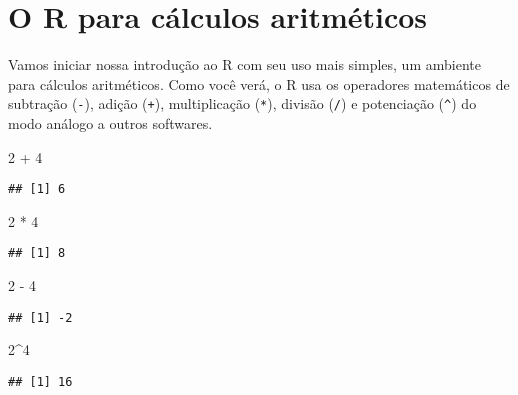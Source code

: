 \documentclass[
]{book}
\newenvironment{Shaded}{\begin{snugshade}}{\end{snugshade}}
\newcommand{\DecValTok}[1]{\textcolor[rgb]{0.00,0.00,0.81}{#1}}
\newcommand{\SpecialCharTok}[1]{\textcolor[rgb]{0.00,0.00,0.00}{#1}}
\begin{document}
\hypertarget{o-r-para-cuxe1lculos-aritmuxe9ticos}{%
\section{O R para cálculos aritméticos}\label{o-r-para-cuxe1lculos-aritmuxe9ticos}}

Vamos iniciar nossa introdução ao R com seu uso mais simples, um ambiente para cálculos aritméticos. Como você verá, o R usa os operadores matemáticos de subtração (\texttt{-}), adição (\texttt{+}), multiplicação (\texttt{*}), divisão (\texttt{/}) e potenciação (\texttt{\^{}}) do modo análogo a outros softwares.

\begin{Shaded}
\begin{Highlighting}[]
\DecValTok{2} \SpecialCharTok{+} \DecValTok{4}
\end{Highlighting}
\end{Shaded}

\begin{verbatim}
## [1] 6
\end{verbatim}

\begin{Shaded}
\begin{Highlighting}[]
\DecValTok{2} \SpecialCharTok{*} \DecValTok{4}
\end{Highlighting}
\end{Shaded}

\begin{verbatim}
## [1] 8
\end{verbatim}

\begin{Shaded}
\begin{Highlighting}[]
\DecValTok{2} \SpecialCharTok{{-}} \DecValTok{4}
\end{Highlighting}
\end{Shaded}

\begin{verbatim}
## [1] -2
\end{verbatim}

\begin{Shaded}
\begin{Highlighting}[]
\DecValTok{2}\SpecialCharTok{\^{}}\DecValTok{4}
\end{Highlighting}
\end{Shaded}

\begin{verbatim}
## [1] 16
\end{verbatim}
\end{document}
